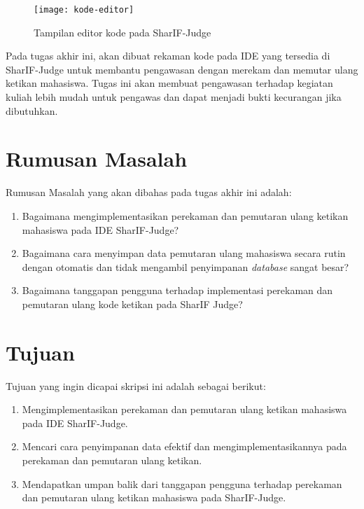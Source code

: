 \begin{figure} 
	\centering  
	\texttt{[image: kode-editor]}  
	\caption[Tampilan editor kode pada SharIF-Judge]{Tampilan editor kode pada SharIF-Judge} 
	\label{fig:editor-kode} 
\end{figure} 

Pada tugas akhir ini, akan dibuat rekaman kode pada IDE yang tersedia di SharIF-Judge untuk membantu pengawasan dengan merekam dan memutar ulang ketikan mahasiswa. Tugas ini akan membuat pengawasan terhadap kegiatan kuliah lebih mudah untuk pengawas dan dapat menjadi bukti kecurangan jika dibutuhkan.

\section{Rumusan Masalah}
\label{sec:1:rumusan}

Rumusan Masalah yang akan dibahas pada tugas akhir ini adalah:
 \begin{enumerate}
     \item Bagaimana mengimplementasikan perekaman dan pemutaran ulang ketikan mahasiswa pada IDE SharIF-Judge?
     \item Bagaimana cara menyimpan data pemutaran ulang mahasiswa secara rutin dengan otomatis dan tidak mengambil penyimpanan \textit{database} sangat besar?
     \item Bagaimana tanggapan pengguna terhadap implementasi perekaman dan pemutaran ulang kode ketikan pada SharIF Judge?
 \end{enumerate}
 
\section{Tujuan}
\label{sec:1:tujuan}

Tujuan yang ingin dicapai skripsi ini adalah sebagai berikut:
    \begin{enumerate}
        \item Mengimplementasikan perekaman dan pemutaran ulang ketikan mahasiswa pada IDE SharIF-Judge.
        \item Mencari cara penyimpanan data efektif dan mengimplementasikannya pada perekaman dan pemutaran ulang ketikan. 
        \item Mendapatkan umpan balik dari tanggapan pengguna terhadap perekaman dan pemutaran ulang ketikan mahasiswa pada SharIF-Judge.
    \end{enumerate}
    
